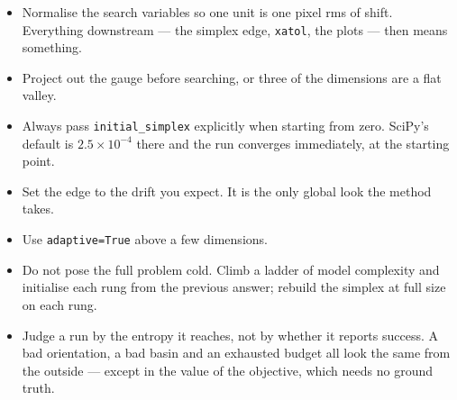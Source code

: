 \documentclass[11pt,a4paper]{article}
\begin{document}
\begin{itemize}
\item Normalise the search variables so one unit is one pixel rms of shift.
  Everything downstream --- the simplex edge, \texttt{xatol}, the plots ---
  then means something.
\item Project out the gauge before searching, or three of the dimensions are a
  flat valley.
\item Always pass \texttt{initial\_simplex} explicitly when starting from
  zero.  SciPy's default is $2.5\times10^{-4}$ there and the run converges
  immediately, at the starting point.
\item Set the edge to the drift you expect.  It is the only global look the
  method takes.
\item Use \texttt{adaptive=True} above a few dimensions.
\item Do not pose the full problem cold.  Climb a ladder of model complexity
  and initialise each rung from the previous answer; rebuild the simplex at
  full size on each rung.
\item Judge a run by the entropy it reaches, not by whether it reports
  success.  A bad orientation, a bad basin and an exhausted budget all look
  the same from the outside --- except in the value of the objective, which
  needs no ground truth.
\end{itemize}
\end{document}
